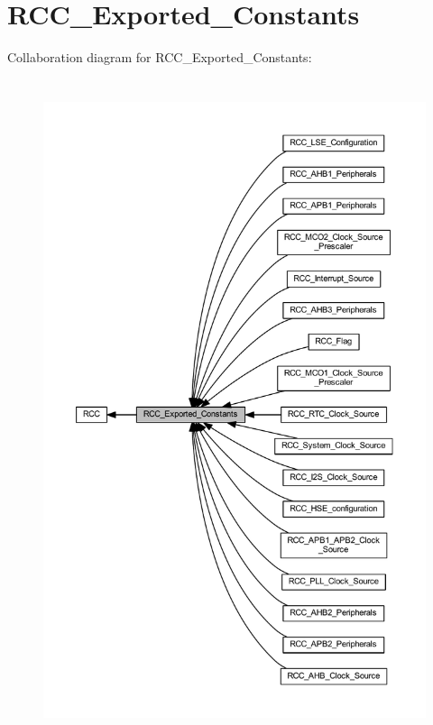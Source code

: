 \hypertarget{group___r_c_c___exported___constants}{}\section{R\+C\+C\+\_\+\+Exported\+\_\+\+Constants}
\label{group___r_c_c___exported___constants}
Collaboration diagram for R\+C\+C\+\_\+\+Exported\+\_\+\+Constants\+:
\nopagebreak
\begin{figure}[H]
\begin{center}
\leavevmode
\includegraphics[height=550pt]{group___r_c_c___exported___constants}
\end{center}
\end{figure}
